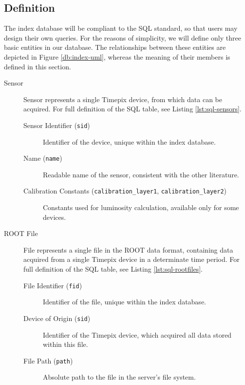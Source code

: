 \subsection{Definition}
The index database will be compliant to the SQL standard, so that users may design their own queries. For the reasons of simplicity, we will define only three basic entities in our database. The relationships between these entities are depicted in Figure \ref{db:index-uml}, whereas the meaning of their members is defined in this section.


\label{db:definition}
\begin{description}
	\item[Sensor]
	Sensor represents a single Timepix device, from which data can be acquired. For full definition of the SQL table, see Listing \ref{lst:sql-sensors}.

	\begin{description}
		\item[Sensor Identifier (\texttt{sid})]
		Identifier of the device, unique within the index database.

		\item[Name (\texttt{name})]
		Readable name of the sensor, consistent with the other literature.

		\item[Calibration Constants (\texttt{calibration\_layer1}, \texttt{calibration\_layer2})]
		Constants used for luminosity calculation, available only for some devices.
	\end{description}

	\item[ROOT File]
	File represents a single file in the ROOT data format, containing data acquired from a single Timepix device in a determinate time period. For full definition of the SQL table, see Listing \ref{lst:sql-rootfiles}.

	\begin{description}
		\item[File Identifier (\texttt{fid})] 
		Identifier of the file, unique within the index database.

		\item[Device of Origin (\texttt{sid})]
		Identifier of the Timepix device, which acquired all data stored within this file.

		\item[File Path (\texttt{path})] 
		Absolute path to the file in the server's file system.


\end{description}
\end{description}
